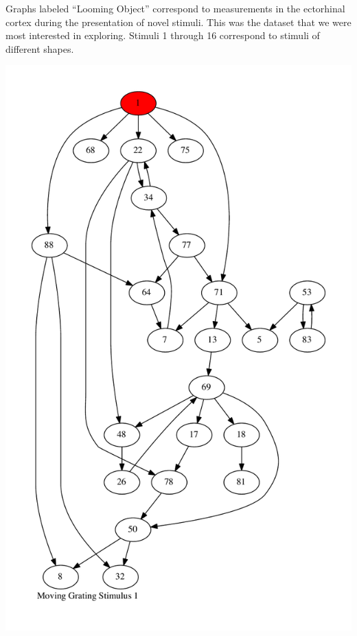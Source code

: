 \documentclass{article}
\begin{document}
Graphs labeled ``Looming Object'' correspond to measurements in the ectorhinal 
cortex during the presentation of novel stimuli. This was the dataset that we 
were most interested in exploring. Stimuli 1 through 16 correspond to stimuli  
of different shapes. \par


\newpage
\includegraphics[max height=\textheight,max width=\textwidth]{stim_mov_grat/stim1_pp.pdf}
\end{document}

